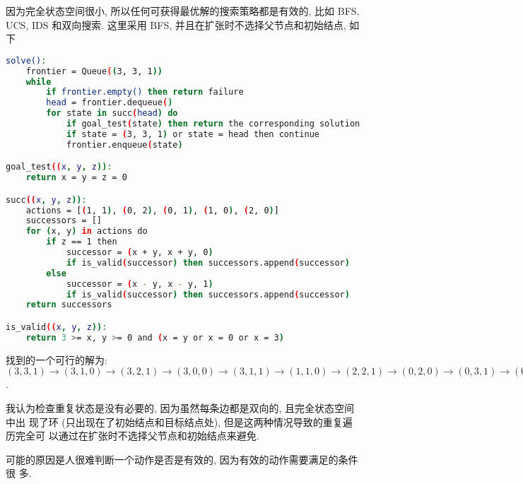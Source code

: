 \documentclass{homework}
\begin{document}
\begin{alphaparts}
\begin{center}
{
        }
    \end{center}
    \questionpart{}
    因为完全状态空间很小, 所以任何可获得最优解的搜索策略都是有效的, 比如 BFS,
    UCS, IDS 和双向搜索. 这里采用 BFS, 并且在扩张时不选择父节点和初始结点, 如下
    \begin{lstlisting}[language=Bash]
solve():
    frontier = Queue((3, 3, 1))
    while 
        if frontier.empty() then return failure
        head = frontier.dequeue()
        for state in succ(head) do
            if goal_test(state) then return the corresponding solution
            if state = (3, 3, 1) or state = head then continue
            frontier.enqueue(state)

goal_test((x, y, z)):
    return x = y = z = 0

succ((x, y, z)):
    actions = [(1, 1), (0, 2), (0, 1), (1, 0), (2, 0)]
    successors = []
    for (x, y) in actions do
        if z == 1 then
            successor = (x + y, x + y, 0)
            if is_valid(successor) then successors.append(successor)
        else
            successor = (x - y, x - y, 1)
            if is_valid(successor) then successors.append(successor)
    return successors

is_valid((x, y, z)):
    return 3 >= x, y >= 0 and (x = y or x = 0 or x = 3)
    \end{lstlisting}
    找到的一个可行的解为: $(3, 3, 1) \to (3, 1, 0) \to (3, 2, 1) \to (3, 0, 0)
        \to (3, 1, 1) \to (1, 1, 0) \to (2, 2, 1) \to (0, 2, 0) \to (0, 3, 1)
        \to (0, 1, 0) \to (1, 1, 1) \to (0, 0, 0)$.

    我认为检查重复状态是没有必要的, 因为虽然每条边都是双向的, 且完全状态空间中出
    现了环 (只出现在了初始结点和目标结点处), 但是这两种情况导致的重复遍历完全可
    以通过在扩张时不选择父节点和初始结点来避免.

    \questionpart{}
    可能的原因是人很难判断一个动作是否是有效的, 因为有效的动作需要满足的条件很
    多.
\end{alphaparts}
\end{document}
